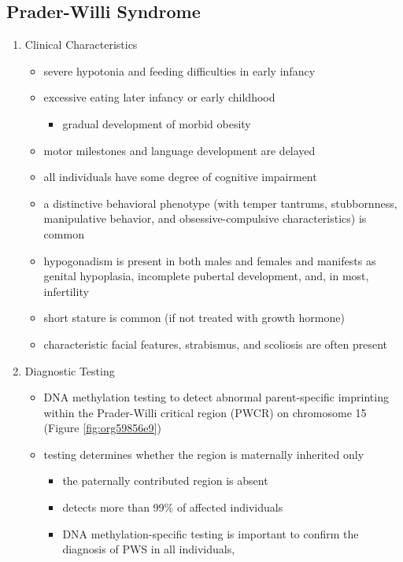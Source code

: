 \documentclass[12pt]{scrartcl}
\begin{document}
\subsection{Prader-Willi Syndrome}
\label{sec:orgab0436e}
\begin{enumerate}
\item Clinical Characteristics
\label{sec:orgb6f86b8}
\begin{itemize}
\item severe hypotonia and feeding difficulties in early infancy
\item excessive eating later infancy or early childhood
\begin{itemize}
\item gradual development of morbid obesity
\end{itemize}
\item motor milestones and language development are delayed
\item all individuals have some degree of cognitive impairment
\item a distinctive behavioral phenotype (with temper tantrums,
stubbornness, manipulative behavior, and obsessive-compulsive
characteristics) is common
\item hypogonadism is present in both males and females and manifests as
genital hypoplasia, incomplete pubertal development, and, in most,
infertility
\item short stature is common (if not treated with growth hormone)
\item characteristic facial features, strabismus, and scoliosis are often
present
\end{itemize}

\item Diagnostic Testing
\label{sec:org303085d}
\begin{itemize}
\item DNA methylation testing to detect abnormal parent-specific
imprinting within the Prader-Willi critical region (PWCR) on
chromosome 15 (Figure \ref{fig:org59856e9})
\item testing determines whether the region is maternally inherited only
\begin{itemize}
\item the paternally contributed region is absent
\item detects more than 99\% of affected individuals
\item DNA methylation-specific testing is important to confirm the
diagnosis of PWS in all individuals,
\end{itemize}
\end{itemize}


\end{enumerate}
\end{document}
